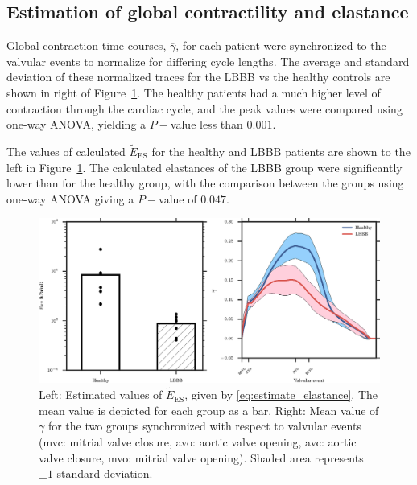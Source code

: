 \documentclass[times]{elsarticle}
\newcommand{\es}{_{\text{ES}}}
\begin{document}
\subsection{Estimation of global contractility and elastance}

Global contraction time courses, $\overline{\gamma}$, for each 
patient were synchronized to the valvular
events to normalize for differing cycle lengths. The average 
and standard deviation of these normalized traces for the
LBBB vs the healthy controls are shown in right of
Figure~\ref{fig:contractility}. The healthy patients had a much higher
level of contraction through the cardiac cycle, and the peak values
were compared using one-way ANOVA, yielding a $P-$value less than
$0.001$. 

The values of calculated $\tilde{E}\es$ for the healthy and LBBB patients are
shown to the left in Figure~\ref{fig:contractility}. The calculated
elastances of the LBBB group were significantly lower than for the healthy
group, with the comparison between the groups using one-way ANOVA
giving a $P-$value of $0.047$. 




\begin{figure}[htbp]
  \centering
  \includegraphics[width=\textwidth]{contractility}
  \caption{Left: Estimated values of $\tilde{E}\es$, given by
    \eqref{eq:estimate_elastance}. The mean value is depicted for each
    group as a bar. Right: Mean value of $\gamma$ for the two groups
    synchronized with respect to valvular events (mvc: mitrial valve
    closure, avo: aortic valve opening, avc: aortic valve closure,
    mvo: mitrial valve opening). Shaded area represents $\pm 1$
    standard deviation.} 
  \label{fig:contractility}
\end{figure}
\end{document}
